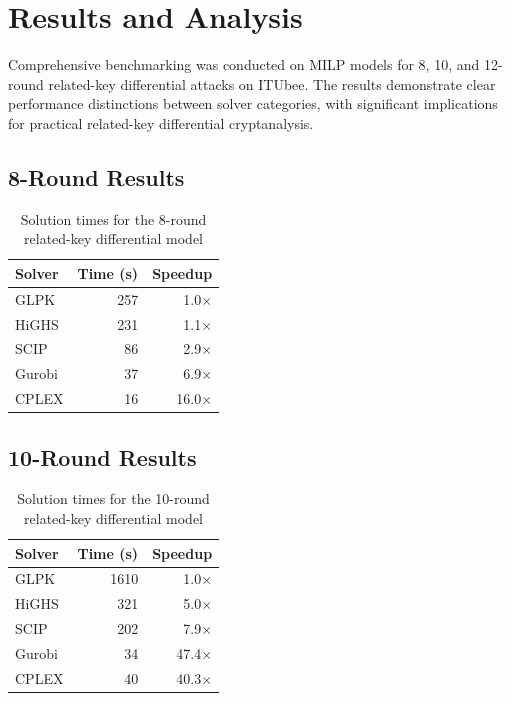 \documentclass[11pt,a4paper]{article}
\begin{document}
\section{Results and Analysis}

Comprehensive benchmarking was conducted on MILP models for 8, 10, and 12-round related-key differential attacks on ITUbee. The results demonstrate clear performance distinctions between solver categories, with significant implications for practical related-key differential cryptanalysis.

\subsection{8-Round Results}

\begin{table}[ht]
  \centering
  \caption{Solution times for the 8-round related-key differential model}
  \label{tab:8round}
  \begin{tabular}{lrr}
    \toprule
    Solver  & Time (s) & Speedup \\
    \midrule
    GLPK   & 257  & 1.0$\times$ \\
    HiGHS  & 231  & 1.1$\times$ \\
    SCIP   & 86   & 2.9$\times$ \\
    Gurobi & 37   & 6.9$\times$ \\
    CPLEX  & 16   & 16.0$\times$ \\
    \bottomrule
  \end{tabular}
\end{table}

\subsection{10-Round Results}

\begin{table}[ht]
  \centering
  \caption{Solution times for the 10-round related-key differential model}
  \label{tab:10round}
  \begin{tabular}{lrr}
    \toprule
    Solver  & Time (s) & Speedup \\
    \midrule
    GLPK   & 1610 & 1.0$\times$ \\
    HiGHS  & 321  & 5.0$\times$ \\
    SCIP   & 202  & 7.9$\times$ \\
    Gurobi & 34   & 47.4$\times$ \\
    CPLEX  & 40   & 40.3$\times$ \\
    \bottomrule
  \end{tabular}
\end{table}
\end{document}
